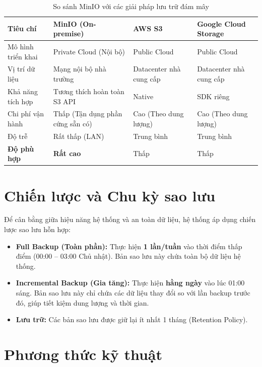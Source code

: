 \begin{table}[H]
\centering
\caption{So sánh MinIO với các giải pháp lưu trữ đám mây}
\label{tab:backup_comparison}
\begin{tabular}{|p{3cm}|p{3.5cm}|p{3cm}|p{3cm}|}
\hline
\textbf{Tiêu chí} & \textbf{MinIO (On-premise)} & \textbf{AWS S3} & \textbf{Google Cloud Storage} \\
\hline
Mô hình triển khai & Private Cloud (Nội bộ) & Public Cloud & Public Cloud \\
\hline
Vị trí dữ liệu & Mạng nội bộ nhà trường & Datacenter nhà cung cấp & Datacenter nhà cung cấp \\
\hline
Khả năng tích hợp & Tương thích hoàn toàn S3 API & Native & SDK riêng \\
\hline
Chi phí vận hành & Thấp (Tận dụng phần cứng sẵn có) & Cao (Theo dung lượng) & Cao (Theo dung lượng) \\
\hline
Độ trễ & Rất thấp (LAN) & Trung bình & Trung bình \\
\hline
\textbf{Độ phù hợp} & \textbf{Rất cao} & Thấp & Thấp \\
\hline
\end{tabular}
\end{table}

\section{Chiến lược và Chu kỳ sao lưu}

Để cân bằng giữa hiệu năng hệ thống và an toàn dữ liệu, hệ thống áp dụng chiến lược sao lưu hỗn hợp:

\begin{itemize}
    \item \textbf{Full Backup (Toàn phần):} Thực hiện \textbf{1 lần/tuần} vào thời điểm thấp điểm (00:00 – 03:00 Chủ nhật). Bản sao lưu này chứa toàn bộ dữ liệu hệ thống.
    \item \textbf{Incremental Backup (Gia tăng):} Thực hiện \textbf{hằng ngày} vào lúc 01:00 sáng. Bản sao lưu này chỉ chứa các dữ liệu thay đổi so với lần backup trước đó, giúp tiết kiệm dung lượng và thời gian.
    \item \textbf{Lưu trữ:} Các bản sao lưu được giữ lại ít nhất 1 tháng (Retention Policy).
\end{itemize}

\section{Phương thức kỹ thuật}

